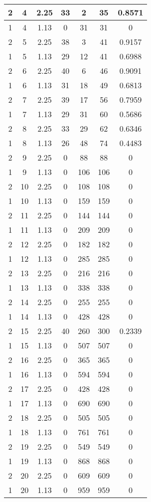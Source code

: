 \documentclass[letterpaper, 12pt]{article}
\begin{document}
\begin{longtable}{|c|c|c|c|c|c|c|}
\hline
2 & 4 & 2.25 & 33 & 2 & 35 & 0.8571 \\
\hline
1 & 4 & 1.13 & 0 & 31 & 31 & 0 \\
\hline
2 & 5 & 2.25 & 38 & 3 & 41 & 0.9157 \\
\hline
1 & 5 & 1.13 & 29 & 12 & 41 & 0.6988 \\
\hline
2 & 6 & 2.25 & 40 & 6 & 46 & 0.9091 \\
\hline
1 & 6 & 1.13 & 31 & 18 & 49 & 0.6813 \\
\hline
2 & 7 & 2.25 & 39 & 17 & 56 & 0.7959 \\
\hline
1 & 7 & 1.13 & 29 & 31 & 60 & 0.5686 \\
\hline
2 & 8 & 2.25 & 33 & 29 & 62 & 0.6346 \\
\hline
1 & 8 & 1.13 & 26 & 48 & 74 & 0.4483 \\
\hline
2 & 9 & 2.25 & 0 & 88 & 88 & 0 \\
\hline
1 & 9 & 1.13 & 0 & 106 & 106 & 0 \\
\hline
2 & 10 & 2.25 & 0 & 108 & 108 & 0 \\
\hline
1 & 10 & 1.13 & 0 & 159 & 159 & 0 \\
\hline
2 & 11 & 2.25 & 0 & 144 & 144 & 0 \\
\hline
1 & 11 & 1.13 & 0 & 209 & 209 & 0 \\
\hline
2 & 12 & 2.25 & 0 & 182 & 182 & 0 \\
\hline
1 & 12 & 1.13 & 0 & 285 & 285 & 0 \\
\hline
2 & 13 & 2.25 & 0 & 216 & 216 & 0 \\
\hline
1 & 13 & 1.13 & 0 & 338 & 338 & 0 \\
\hline
2 & 14 & 2.25 & 0 & 255 & 255 & 0 \\
\hline
1 & 14 & 1.13 & 0 & 428 & 428 & 0 \\
\hline
2 & 15 & 2.25 & 40 & 260 & 300 & 0.2339 \\
\hline
1 & 15 & 1.13 & 0 & 507 & 507 & 0 \\
\hline
2 & 16 & 2.25 & 0 & 365 & 365 & 0 \\
\hline
1 & 16 & 1.13 & 0 & 594 & 594 & 0 \\
\hline
2 & 17 & 2.25 & 0 & 428 & 428 & 0 \\
\hline
1 & 17 & 1.13 & 0 & 690 & 690 & 0 \\
\hline
2 & 18 & 2.25 & 0 & 505 & 505 & 0 \\
\hline
1 & 18 & 1.13 & 0 & 761 & 761 & 0 \\
\hline
2 & 19 & 2.25 & 0 & 549 & 549 & 0 \\
\hline
1 & 19 & 1.13 & 0 & 868 & 868 & 0 \\
\hline
2 & 20 & 2.25 & 0 & 609 & 609 & 0 \\
\hline
1 & 20 & 1.13 & 0 & 959 & 959 & 0 \\
\hline
\end{longtable}
\end{document}
